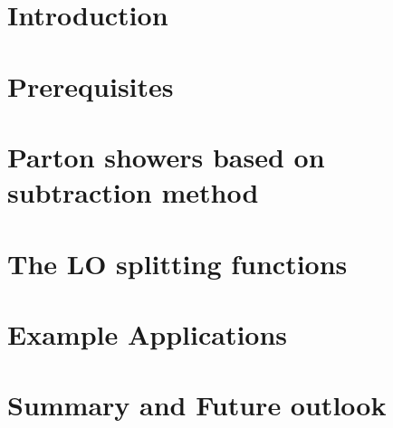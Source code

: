 \documentclass[12pt,a4paper,oneside]{report}
\begin{document}
    \parindent=0pt
    \linespread{1.2}
    \thispagestyle{plain}


\newpage
\thispagestyle{empty}
\quad
\newpage

\newpage
\thispagestyle{empty}
\quad
\newpage


\newpage
\thispagestyle{empty}
\quad
\newpage

\tableofcontents
\thispagestyle{empty}

\newpage
\thispagestyle{empty}
\quad
\newpage

\chapter{Introduction}

\newpage
\thispagestyle{empty}
\quad
\newpage
\chapter{Prerequisites}
\label{Prerequisites}

\chapter{Parton showers based on\\ subtraction method}
\label{Parton showers}



\label{parametrisation}
\newpage

\chapter{The LO splitting functions}
\label{LO}

\newpage

\newpage
 
\newpage
  
\newpage
\chapter{Example Applications}
\label{Example Applications}

\chapter{Summary and Future outlook}
\label{Summary}
  
  
\end{document}
